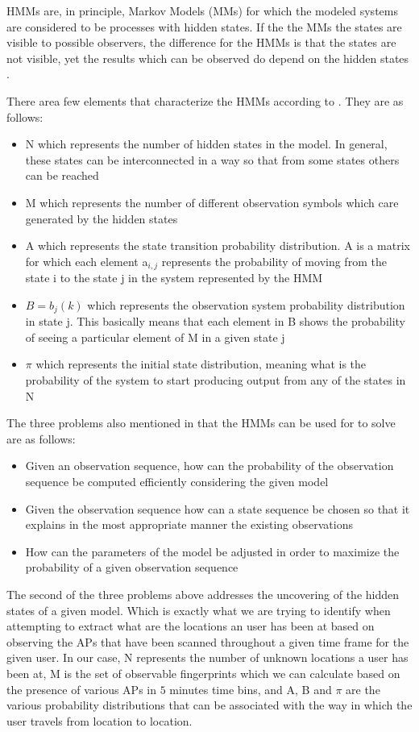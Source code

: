HMMs are, in principle, Markov Models (MMs) \cite{opac-b1082850} for which the
modeled systems are considered to be processes with hidden states. If the the
MMs the states are visible to possible observers, the difference for the HMMs is
that the states are not visible, yet the results which can be observed do depend
on the hidden states \cite{18626}.

There area few elements that characterize the HMMs according to \cite{18626}.
They are as follows:
\begin{itemize}
  \item N which represents the number of hidden states in the model. In general,
  these states can be interconnected in a way so that from some states others
  can be reached
  \item M which represents the number of different observation symbols which
  care generated by the hidden states
  \item A which represents the state transition probability distribution. A is a
  matrix for which each element a$_{i,j}$ represents the probability of moving
  from the state i to the state j in the system represented by the HMM
  \item $B = {b_{j}(k)}$ which represents the observation system probability
  distribution in state j. This basically means that each element in B shows the
  probability of seeing a particular element of M in a given state j
  \item $\pi$ which represents the initial state distribution, meaning what is
  the probability of the system to start producing output from any of the states in
  N
\end{itemize}

The three problems also mentioned in \cite{18626} that the HMMs can be used for
to solve are as follows:
\begin{itemize}
  \item Given an observation sequence, how can the probability of the
  observation sequence be computed efficiently considering the given model
  \item Given the observation sequence how can a state sequence be chosen so
  that it explains in the most appropriate manner the existing observations
  \item How can the parameters of the model be adjusted in order to maximize the
  probability of a given observation sequence
\end{itemize}

The second of the three problems above addresses the uncovering of the hidden
states of a given model. Which is exactly what we are trying to identify when
attempting to extract what are the locations an user has been at based on
observing the APs that have been scanned throughout a given time frame for the
given user. In our case, N represents the number of unknown locations a user has
been at, M is the set of observable fingerprints which we can calculate based
on the presence of various APs in $5$ minutes time bins, and A, B and $\pi$ are
the various probability distributions that can be associated with the way in
which the user travels from location to location.

